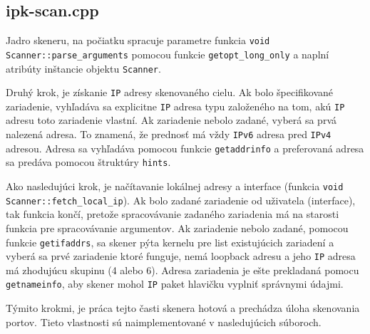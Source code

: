 \documentclass[titlepage]{article}
\begin{document}
\subsection{ipk-scan.cpp}
Jadro skeneru, na počiatku spracuje parametre funkcia \verb|void Scanner::parse_arguments| pomocou funkcie \verb|getopt_long_only| a naplní atribúty inštancie objektu \verb|Scanner|. \par 

Druhý krok, je získanie \verb|IP| adresy skenovaného cielu. Ak bolo špecifikované zariadenie, vyhľadáva sa explicitne \verb|IP| adresa typu založeného na tom, akú \verb|IP| adresu toto zariadenie vlastní. Ak zariadenie nebolo zadané, vyberá sa prvá nalezená adresa. To znamená, že prednosť má vždy \verb|IPv6| adresa pred \verb|IPv4| adresou. Adresa sa vyhľadáva pomocou funkcie \verb|getaddrinfo| a preferovaná adresa sa predáva pomocou štruktúry \verb|hints|.\par

Ako nasledujúci krok, je načítavanie lokálnej adresy a interface \break (funkcia \verb|void Scanner::fetch_local_ip|). Ak bolo zadané zariadenie od uživatela (interface), tak funkcia končí, pretože spracovávanie zadaného zariadenia má na starosti funkcia pre spracovávanie argumentov. Ak zariadenie nebolo zadané, pomocou funkcie \verb|getifaddrs|, sa skener pýta kernelu pre list existujúcich zariadení a vyberá sa prvé zariadenie ktoré funguje, nemá loopback adresu a jeho \verb|IP| adresa má zhodujúcu skupinu (4 alebo 6). Adresa zariadenia je ešte prekladaná pomocu \verb|getnameinfo|, aby skener mohol \verb|IP| paket hlavičku vyplniť správnymi údajmi. \par

Týmito krokmi, je práca tejto časti skenera hotová a prechádza úloha skenovania portov. Tieto vlastnosti sú naimplementované v nasledujúcich súboroch.
\end{document}

